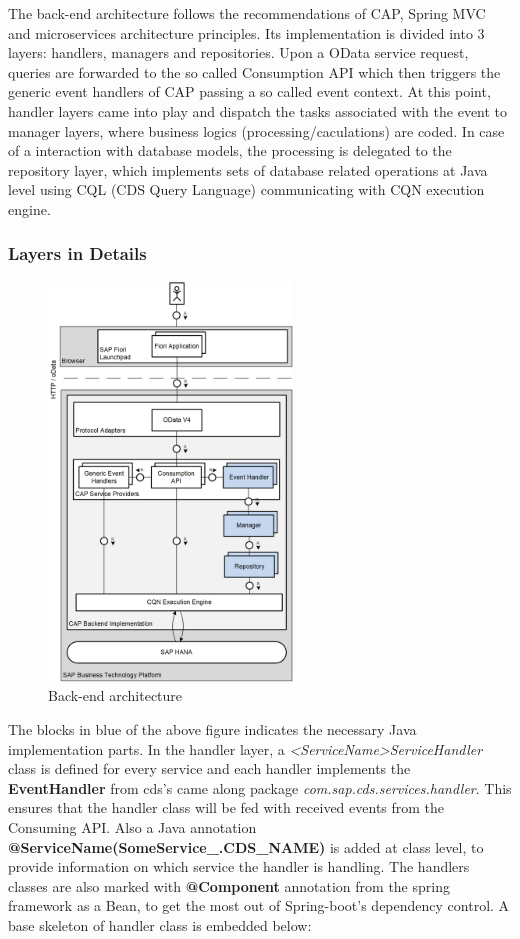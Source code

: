 The back-end architecture follows the recommendations of CAP, Spring MVC and microservices architecture principles. Its implementation is divided into 3 layers: handlers, managers and repositories. Upon a OData service request, queries are forwarded to the so called Consumption API which then triggers the generic event handlers of CAP passing a so called event context. At this point, handler layers came into play and dispatch the tasks associated with the event to manager layers, where business logics (processing/caculations) are coded. In case of a interaction with database models, the processing is delegated to the repository layer, which implements sets of database related operations at Java level using CQL (CDS Query Language) communicating with CQN execution engine. 

\subsubsection{Layers in Details}

\begin{figure}[H]
	\centering
	\includegraphics[height=400px]{images/backend_architecture.png}
	\caption{Back-end architecture}
	\label{fig:backArch}
\end{figure}

The blocks in blue of the above figure indicates the necessary Java implementation parts. In the handler layer, a \textit{<ServiceName>ServiceHandler} class is defined for every service and each handler implements the \textbf{EventHandler} from cds's came along package \textit{com.sap.cds.services.handler}. This ensures that the handler class will be fed with received events from the Consuming API. Also a Java annotation \textbf{@ServiceName(SomeService\_.CDS\_NAME)} is added at class level, to provide information on which service the handler is handling. The handlers classes are also marked with \textbf{@Component} annotation from the spring framework as a Bean, to get the most out of Spring-boot's dependency control. A base skeleton of handler class is embedded below:

